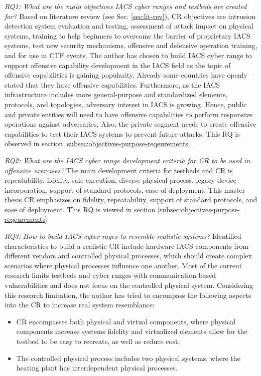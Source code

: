 \textit{RQ1: What are the main objectives IACS cyber ranges and testbeds are created for?} Based on literature review (see Sec. \ref{sec:lit-rev}), CR objectives are intrusion detection system evaluation and testing, assessment of attack impact on physical systems, training to help beginners to overcome the barrier of proprietary IACS systems, test new security mechanisms, offensive and defensive operation training, and for use in CTF events. The author has chosen to build IACS cyber range to support offensive capability development in the IACS field as the topic of offensive capabilities is gaining popularity. Already some countries have openly stated that they have offensive capabilities. Furthermore, as the IACS infrastructure includes more general-purpose and standardized elements, protocols, and topologies, adversary interest in IACS is growing. Hence, public and private entities will need to have offensive capabilities to perform responsive operations against adversaries. Also, the private segment needs to create offensive capabilities to test their IACS systems to prevent future attacks. This RQ is observed in section \ref{subsec:objectives-purpose-reqeurements}

\textit{RQ2: What are the IACS cyber range development criteria for CR to be used in offensive exercises?} The main development criteria for testbeds and CR is repeatability, fidelity, safe execution, diverse physical process, legacy device incorporation, support of standard protocols, ease of deployment. This master thesis CR emphasizes on fidelity, repeatability, support of standard protocols, and ease of deployment. This RQ is viewed in section \ref{subsec:objectives-purpose-reqeurements}

\textit{RQ3: How to build IACS cyber rages to resemble realistic systems?} Identified characteristics to build a realistic CR include hardware IACS components from different vendors and controlled physical processes, which should create complex scenarios where physical processes influence one another.  Most of the current research limits testbeds and cyber ranges with communication-based vulnerabilities and does not focus on the controlled physical system. Considering this research limitation, the author has tried to encompass the following aspects into the CR to increase real system resemblance:

\begin{itemize}
	\item CR encompasses both physical and virtual components, where physical components increase systems fidelity and virtualized elements allow for the testbed to be easy to recreate, as well as reduce cost;
	
	\item The controlled physical process includes two physical systems, where the heating plant has interdependent physical processes.
\end{itemize}

